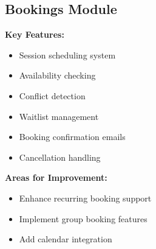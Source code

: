 \subsection{Bookings Module}
\begin{tcolorbox}[
    enhanced,
    title={Bookings Module: 80\% Complete},
    attach boxed title to top left,
    boxed title style={
        colback=success!50,
        colframe=success!50,
        arc=0mm,
    },
    colback=white,
    colframe=success!50,
    arc=0mm,
    fonttitle=\bfseries
]
    \textbf{Key Features:}
    \begin{itemize}
        \item Session scheduling system
        \item Availability checking
        \item Conflict detection
        \item Waitlist management
        \item Booking confirmation emails
        \item Cancellation handling
    \end{itemize}
    
    \textbf{Areas for Improvement:}
    \begin{itemize}
        \item Enhance recurring booking support
        \item Implement group booking features
        \item Add calendar integration
    \end{itemize}
\end{tcolorbox}

